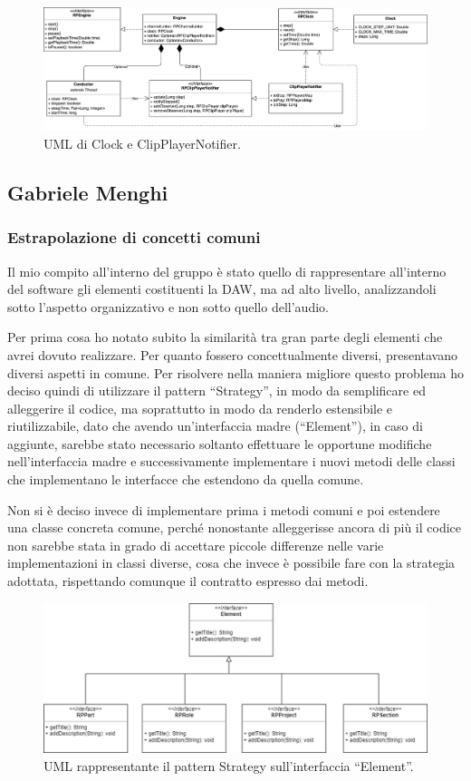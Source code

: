 \documentclass[a4paper,12pt]{report}
\begin{document}
\begin{figure}[H]
\centering{}
\includegraphics[width=\textwidth]{img/clock.png}
\caption{UML di Clock e ClipPlayerNotifier.}
\end{figure}

\subsection{Gabriele Menghi}
\subsubsection{Estrapolazione di concetti comuni}
Il mio compito all’interno del gruppo è stato quello di rappresentare all’interno del software gli elementi costituenti la DAW, ma ad alto livello, analizzandoli sotto l’aspetto organizzativo e non sotto quello dell’audio.

Per prima cosa ho notato subito la similarità tra gran parte degli elementi che avrei dovuto realizzare. Per quanto fossero concettualmente diversi, presentavano diversi aspetti in comune. Per risolvere nella maniera migliore questo problema ho deciso quindi di utilizzare il pattern “Strategy”, in modo da semplificare ed alleggerire il codice, ma soprattutto in modo da renderlo estensibile e riutilizzabile, dato che avendo un’interfaccia madre (“Element”), in caso di aggiunte, sarebbe stato necessario soltanto effettuare le opportune modifiche nell’interfaccia madre e successivamente implementare i nuovi metodi delle classi che implementano le interfacce che estendono da quella comune.

Non si è deciso invece di implementare prima i metodi  comuni e poi estendere una classe concreta comune, perché nonostante alleggerisse ancora di più il codice non sarebbe stata in grado di accettare piccole differenze nelle varie implementazioni in classi diverse, cosa che invece è possibile fare con la strategia adottata, rispettando comunque il contratto espresso dai metodi. 
\endsubsubsection

\begin{figure}[h]
\centering{}
\includegraphics[width=\textwidth,scale=1]{img/element.png}
\caption{UML rappresentante il pattern Strategy sull’interfaccia “Element”.}
\end{figure}
\end{document}
